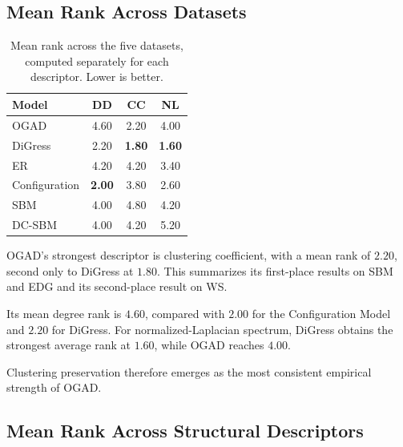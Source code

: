 \subsection{Mean Rank Across Datasets}
\label{subsec:exp_rank_metric}

\begin{table}[htbp]
    \centering
    \caption{Mean rank across the five datasets, computed separately for each descriptor. Lower is better.}
    \label{tab:exp_rank_metric}
    \begin{tabular}{lccc}
        \hline
        Model & DD & CC & NL \\
        \hline
        OGAD          & 4.60 & 2.20 & 4.00 \\
        DiGress       & 2.20 & \textbf{1.80} & \textbf{1.60} \\
        ER            & 4.20 & 4.20 & 3.40 \\
        Configuration & \textbf{2.00} & 3.80 & 2.60 \\
        SBM           & 4.00 & 4.80 & 4.20 \\
        DC-SBM        & 4.00 & 4.20 & 5.20 \\
        \hline
    \end{tabular}
\end{table}

OGAD's strongest descriptor is clustering coefficient, with a mean rank of \(2.20\), second only to DiGress at \(1.80\). This summarizes its first-place results on SBM and EDG and its second-place result on WS.

Its mean degree rank is \(4.60\), compared with \(2.00\) for the Configuration Model and \(2.20\) for DiGress. For normalized-Laplacian spectrum, DiGress obtains the strongest average rank at \(1.60\), while OGAD reaches \(4.00\).

Clustering preservation therefore emerges as the most consistent empirical strength of OGAD.


\subsection{Mean Rank Across Structural Descriptors}
\label{subsec:exp_rank_dataset}

